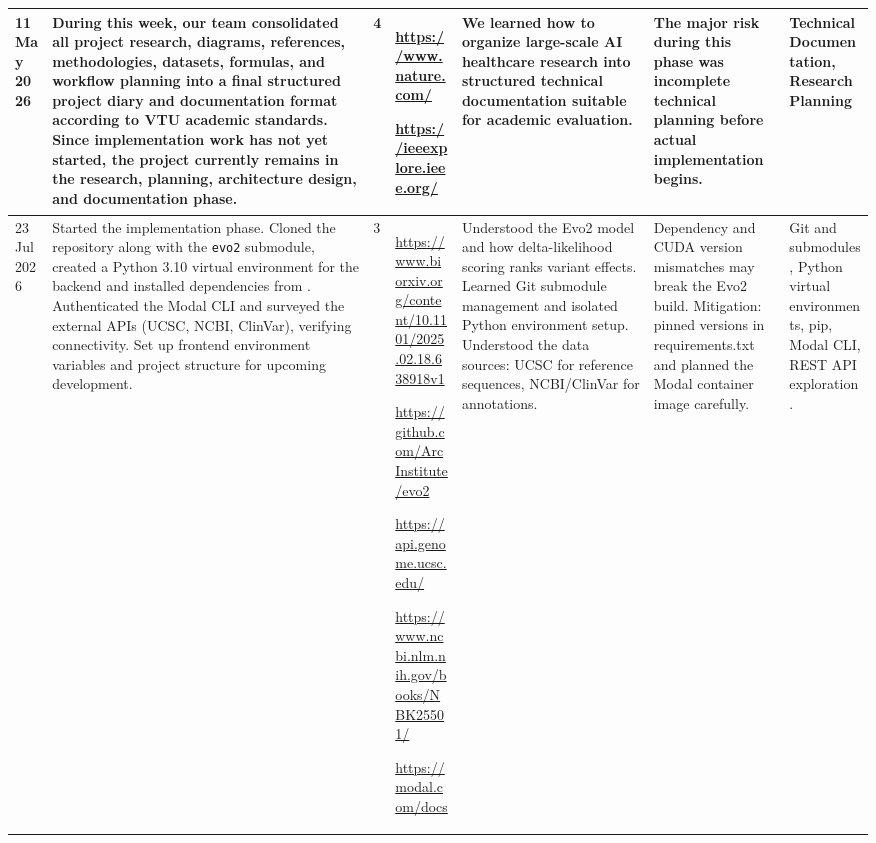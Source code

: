 \documentclass[8pt,a4paper]{article}
\begin{document}
\begin{longtable}{|
    D{1.25cm}|
    D{4.10cm}|
    D{0.70cm}|
    D{2.90cm}|
    D{2.90cm}|
    D{3.00cm}|
    D{2.95cm}|
}
11 May 2026 &
During this week, our team consolidated all project research, diagrams, references, methodologies, datasets, formulas, and workflow planning into a final structured project diary and documentation format according to VTU academic standards. Since implementation work has not yet started, the project currently remains in the research, planning, architecture design, and documentation phase. &
4 &
\url{https://www.nature.com/}
\par
\url{https://ieeexplore.ieee.org/}
&
We learned how to organize large-scale AI healthcare research into structured technical documentation suitable for academic evaluation. &
The major risk during this phase was incomplete technical planning before actual implementation begins. &
Technical Documentation, Research Planning \\
\hline

23 Jul 2026 &
Started the implementation phase. Cloned the repository along with the \texttt{evo2} submodule, created a Python 3.10 virtual environment for the backend and installed dependencies from . Authenticated the Modal CLI and surveyed the external APIs (UCSC, NCBI, ClinVar), verifying connectivity. Set up frontend environment variables and project structure for upcoming development. &
3 &
\url{https://www.biorxiv.org/content/10.1101/2025.02.18.638918v1}
\par
\url{https://github.com/ArcInstitute/evo2}
\par
\url{https://api.genome.ucsc.edu/}
\par
\url{https://www.ncbi.nlm.nih.gov/books/NBK25501/}
\par
\url{https://modal.com/docs}
&
Understood the Evo2 model and how delta-likelihood scoring ranks variant effects. Learned Git submodule management and isolated Python environment setup. Understood the data sources: UCSC for reference sequences, NCBI/ClinVar for annotations. &
Dependency and CUDA version mismatches may break the Evo2 build. Mitigation: pinned versions in requirements.txt and planned the Modal container image carefully. &
Git and submodules, Python virtual environments, pip, Modal CLI, REST API exploration. \\
\hline


\end{longtable}
\end{document}
